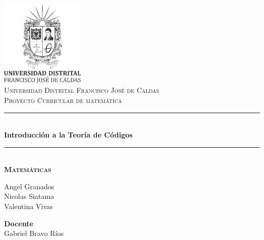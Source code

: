 
\begin{titlepage}


\newcommand{\HRule}{\rule{\linewidth}{0.5mm}} %





\begin{center} 



\includegraphics[width = 4cm]{./figures/ud}\\[1.5cm] 
\textsc{\Large Universidad Distrital Francisco José de Caldas}\\[0.5cm] 
\textsc{\large Proyecto Curricular de matemática}\\[0.95cm] 






\HRule \\[0.4cm]
{ \huge \bfseries Introducción a la Teoría de Códigos }\\  
\HRule \\[0.5cm]
\textbf{\textsc{\normalsize Matemáticas}}\\[1.0cm] 
\end{center}





\begin{center}
     Angel Granados \\
     Nicolas Siatama \\
     Valentina Vivas
    
      \hspace{2,5 cm}
    


     \textbf{Docente}
     \\
     
     Gabriel Bravo Ríos
     
\end{center}
     



\vfill



\makeatother


\end{titlepage}

